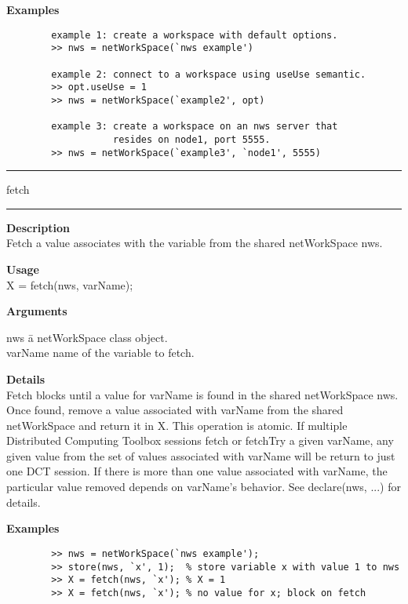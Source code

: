 \begin{list}{}{}
	\item {\bf Examples}
		\begin{verbatim}
		example 1: create a workspace with default options.
		>> nws = netWorkSpace(`nws example')
	
		example 2: connect to a workspace using useUse semantic.
		>> opt.useUse = 1
		>> nws = netWorkSpace(`example2', opt)
	
		example 3: create a workspace on an nws server that
				   resides on node1, port 5555.
		>> nws = netWorkSpace(`example3', `node1', 5555)
		\end{verbatim}
\end{list}

\rule[0.06in]{6in}{0.01in}
\newline
fetch
\newline
\rule{6in}{0.01in}
\begin{list}{}{}
	\item {\bf Description}\\
	Fetch a value associates with the variable from the shared netWorkSpace nws.
	\item {\bf Usage}\\
	X = fetch(nws, varName);
	\item {\bf Arguments}
		\begin{tabbing}
		nws	\hspace{2.5cm} \= a netWorkSpace class object.\\
		varName	\> name of the variable to fetch.\\
		\end{tabbing}
	\item {\bf Details}\\
	Fetch blocks until a value for varName is found in the shared netWorkSpace nws.
	Once found, remove a value associated with varName from the shared netWorkSpace and return it in X. 
	This operation is atomic. If multiple Distributed Computing Toolbox sessions fetch or fetchTry a 
	given varName, any given value from the set of values associated with varName will be return to 
	just one DCT session. If there is more than one value associated with varName, the particular value 
	removed depends on varName's behavior. See declare(nws, ...) for details.
	
	\item {\bf Examples}
		\begin{verbatim}
		>> nws = netWorkSpace(`nws example');
		>> store(nws, `x', 1);  % store variable x with value 1 to nws
		>> X = fetch(nws, `x'); % X = 1
		>> X = fetch(nws, `x'); % no value for x; block on fetch
		\end{verbatim}
\end{list}


